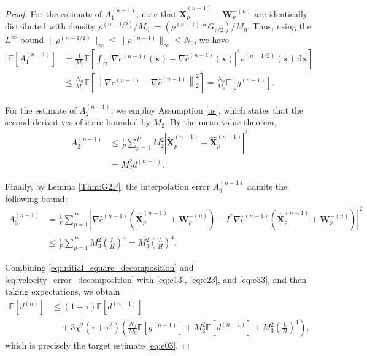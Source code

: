 \documentclass[review,onefignum,onetabnum]{siamart250211}
\begin{document}
\begin{proof}
For the estimate of \(A_1^{(n-1)}\), note that
\(\widetilde{\mathbf{X}}_p^{(n-1)}+\mathbf{W}_p^{-(n)}\) are identically
distributed with density \(\rho^{(n-1/2)}/M_0:=(\rho^{(n-1)} \ast G_{\tau/2})/M_0\). Thus,
using the \(L^\infty\) bound
\(\|\rho^{(n-1/2)}\|_\infty\leq\|\rho^{(n-1)}\|_\infty\leq N_0\), we have
\begin{equation}
\label{eq:e13}
\begin{aligned}
\mathbb{E}[A_1^{(n-1)}]
&=
\frac{1}{M_0}
\mathbb{E}\left[
\int_\Omega
\left|
\nabla c^{(n-1)}(\mathbf{x})
-
\nabla\hat{c}^{(n-1)}(\mathbf{x})
\right|^2
\rho^{(n-1/2)}(\mathbf{x})\,\mathrm{d}\mathbf{x}
\right]\\
&\leq
\frac{N_0}{M_0}
\mathbb{E}\left[
\left\|
\nabla c^{(n-1)}
-
\nabla\hat{c}^{(n-1)}
\right\|_2^2
\right]=
\frac{N_0}{M_0}
\mathbb{E}\left[g^{(n-1)}\right].
\end{aligned}
\end{equation}

For the estimate of \(A_2^{(n-1)}\), we employ
Assumption \ref{as}, which states that the second derivatives
of \(\hat{c}\) are bounded by \(M_2\). By the mean value theorem,
\begin{equation}
\label{eq:e23}
\begin{aligned}
A_2^{(n-1)}
&\leq
\frac{1}{P}\sum_{p=1}^{P}
M_2^2
\left|
\widetilde{\mathbf{X}}_p^{(n-1)}
-
\widehat{\mathbf{X}}_p^{(n-1)}
\right|^2\\
&=
M_2^2d^{(n-1)}.
\end{aligned}
\end{equation}

Finally, by Lemma \ref{Thm:G2P}, the interpolation error
\(A_3^{(n-1)}\) admits the following bound:
\begin{equation}
\label{eq:e33}
\begin{aligned}
A_3^{(n-1)}
&=
\frac{1}{P}\sum_{p=1}^{P}
\left|
\nabla\hat{c}^{(n-1)}
(\widehat{\mathbf{X}}_p^{(n-1)}+\mathbf{W}_p^{-(n)})
-
I^*\nabla\hat{c}^{(n-1)}
(\widehat{\mathbf{X}}_p^{(n-1)}+\mathbf{W}_p^{-(n)})
\right|^2\\
&\leq
\frac{1}{P}\sum_{p=1}^{P}
M_3^2\left(\frac{L}{H}\right)^4=
M_3^2\left(\frac{L}{H}\right)^4.
\end{aligned}
\end{equation}

Combining \eqref{eq:initial_square_decomposition} and
\eqref{eq:velocity_error_decomposition} with
\eqref{eq:e13}, \eqref{eq:e23}, and \eqref{eq:e33}, and
then taking expectations, we obtain
\[
\begin{aligned}
\mathbb{E}[d^{(n)}]
&\leq
(1+\tau)\mathbb{E}[d^{(n-1)}]\\
&\quad+
3\chi^2(\tau+\tau^2)
\left(
\frac{N_0}{M_0}
\mathbb{E}\left[g^{(n-1)}\right]
+
M_2^2\mathbb{E}[d^{(n-1)}]
+
M_3^2\left(\frac{L}{H}\right)^4
\right),
\end{aligned}
\]
which is precisely the target estimate \eqref{eq:e03}.
\end{proof}
\end{document}
